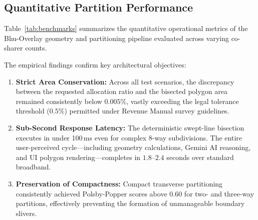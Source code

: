 \documentclass[conference]{IEEEtran}
\begin{document}
\subsection{Quantitative Partition Performance}
Table~\ref{tab:benchmarks} summarizes the quantitative operational metrics of the Bhu-Overlay geometry and partitioning pipeline evaluated across varying co-sharer counts.

\begin{table}[htbp]
\caption{Computational and Spatial Performance Across Partition Scenarios}
\label{tab:benchmarks}
\centering
{}
\end{table}

The empirical findings confirm key architectural objectives:
\begin{enumerate}
    \item \textbf{Strict Area Conservation:} Across all test scenarios, the discrepancy between the requested allocation ratio and the bisected polygon area remained consistently below $0.005\%$, vastly exceeding the legal tolerance threshold ($0.5\%$) permitted under Revenue Manual survey guidelines.
    \item \textbf{Sub-Second Response Latency:} The deterministic swept-line bisection executes in under 100\,ms even for complex 8-way subdivisions. The entire user-perceived cycle---including geometry calculations, Gemini AI reasoning, and UI polygon rendering---completes in $1.8$--$2.4$ seconds over standard broadband.
    \item \textbf{Preservation of Compactness:} Compact transverse partitioning consistently achieved Polsby-Popper scores above $0.60$ for two- and three-way partitions, effectively preventing the formation of unmanageable boundary slivers.
\end{enumerate}
\end{document}
